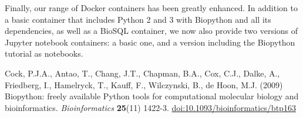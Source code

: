\documentclass[10pt,oneside]{article}
\begin{document}
Finally, our range of Docker containers has been greatly enhanced. In addition to
a basic container that includes Python 2 and 3 with Biopython and all its
dependencies, as well as a BioSQL container, we now also provide two versions
of Jupyter notebook containers: a basic one, and a version including the
Biopython tutorial as notebooks.


\begin{thebibliography}{}

Cock, P.J.A., Antao, T., Chang, J.T., Chapman, B.A., Cox, C.J., Dalke, A., Friedberg, I., Hamelryck, T., Kauff, F., Wilczynski, B., de Hoon, M.J. (2009) Biopython: freely available Python tools for computational molecular biology and bioinformatics. {\it Bioinformatics} {\bf 25}(11) 1422-3. \href{http://dx.doi.org/10.1093/bioinformatics/btp163}{doi:10.1093/bioinformatics/btp163}

\end{thebibliography}
\end{document}
